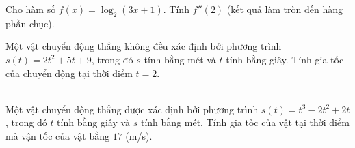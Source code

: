 \begin{ex}%
	Cho hàm số $f(x)=\log_2(3x+1)$. Tính $f''(2)$ (kết quả làm tròn đến hàng phần chục). 
	\\ 
\end{ex}

\begin{ex}
	Một vật chuyển động thẳng không đều xác định bởi phương trình $s(t)=2 t^{2} + 5 t + 9$, trong đó ${s}$ tính bằng mét và ${t}$ tính bằng giây. Tính gia tốc của chuyển động tại thời điểm $t=2$.\\
	\\ 
	\end{ex}

\begin{ex}%
	Một vật chuyển động thẳng được xác định bởi phương trình $s(t)=t^3-2t^2+2t$, trong đó $t$ tính bằng giây và $s$ tính bằng mét. Tính gia tốc của vật tại thời điểm mà vận tốc của vật bằng $17$ (m/s).\\
\end{ex}


